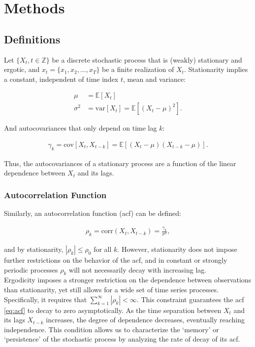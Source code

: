 \documentclass[main.tex]{subfiles}
\begin{document}
\section{Methods}

\subsection{Definitions}

Let $\{X_t, t\in \mathbb{Z}\}$ be a discrete stochastic process that is (weakly) stationary and ergotic, and $x_t = \{x_1, x_2, ..., x_T\}$ be a finite realization of $X_t$. Stationarity implies a constant, independent of time index $t$, mean and variance:

\begin{align*}
\mu &= \mathbb{E}[X_t]\\
\sigma^2 &= \text{var}[X_t] = \mathbb{E}[(X_t - \mu)^2].
\end{align*}


And autocovariances that only depend on time lag $k$:

\begin{align*}
    \gamma_k = \text{cov}[X_t, X_{t-k}] = \mathbb{E}[(X_t - \mu)(X_{t-k} - \mu)].
\end{align*}

Thus, the autocovariances of a stationary process are a function of the linear dependence between $X_t$ and its lags. 

\subsubsection{Autocorrelation Function}
Similarly, an autocorrelation function (acf) can be defined:

\begin{align} \label{eq:acf}
\rho_k = \text{corr}(X_t, X_{t-k}) = \frac{\gamma_k}{\sigma^2},
\end{align}

and by stationarity, $|\rho_k| \le \rho_0$ for all $k$. However, stationarity does not impose further restrictions on the behavior of the acf, and in constant or strongly periodic processes $\rho_k$ will not necessarily decay with increasing lag.\\

Ergodicity imposes a stronger restriction on the dependence between observations than stationarity, yet still allows for a wide set of time series processes. Specifically, it requires that $\sum_{k=1}^\infty |\rho_k| < \infty$. This constraint guarantees the acf \eqref{eq:acf} to decay to zero asymptotically. As the time separation between $X_t$ and its lags $X_{t-k}$ increases, the degree of dependence decreases, eventually reaching independence. This condition allows us to characterize the `memory' or `persistence' of the stochastic process by analyzing the rate of decay of its acf.
\end{document}
